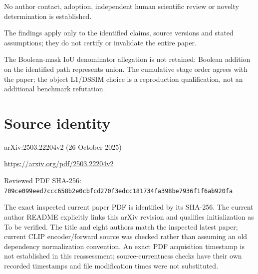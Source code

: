 \documentclass[11pt]{article}
\begin{document}
No author contact, adoption, independent human scientific review or novelty determination is established.\par

The findings apply only to the identified claims, source versions and stated assumptions; they do not certify or invalidate the entire paper.\par

The Boolean-mask IoU denominator allegation is not retained: Boolean addition on the identified path represents union. The cumulative stage order agrees with the paper; the object L1/DSSIM choice is a reproduction qualification, not an additional benchmark refutation.\par

\section*{Source identity}

arXiv:2503.22204v2 (26 October 2025)

\url{https://arxiv.org/pdf/2503.22204v2}

Reviewed PDF SHA-256: \nolinkurl{709ce099eed7ccc658b2e0cbfcd270f3edcc181734fa398be7936f1f6ab920fa}

The exact inspected current paper PDF is identified by its SHA-256. The current author README explicitly links this arXiv revision and qualifies initialization as To be verified. The title and eight authors match the inspected latest paper; current CLIP encoder/forward source was checked rather than assuming an old dependency normalization convention. An exact PDF acquisition timestamp is not established in this reassessment; source-currentness checks have their own recorded timestamps and file modification times were not substituted.
\end{document}
